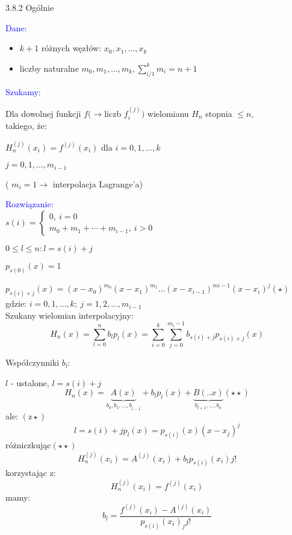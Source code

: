 \begin{frame}
{3.8.2 Ogólnie}

\textcolor{blue}{Dane:}
\begin{itemize}
\item $k+1$ różnych węzłów: $x_{0}, x_{1}, \dots, x_{k}$

\item liczby naturalne $m_{0}, m_{1},\dots , m_{k}, \displaystyle \sum_{i/1}^{k}m_{i}=n+1$
\end{itemize}
\textcolor{blue}{Szukamy:}

Dla dowolnej funkcji $ f(\rightarrow$liczb {\it $f_{i}^{(j)}$}$)$ wielomianu $H_{n}$ stopnia $\leq n,$ \\
takiego, że:

$H_{n}^{(j)}(x_{i})=f^{(j)}(x_{i})$ \quad dla $i=0, 1, \dots , k$
\begin{center}
$j=0, 1, \dots, m_{i-1}$
\end{center}
( $m_{i}=1\rightarrow$ interpolacja Lagrange'a)
\end{frame}

\begin{frame}
\textcolor{blue}{Rozwiązanie:} \\
\vspace{2mm}
$s(i)=\left\{\begin{array}{l}
0,\ i=0\\
m_{0}+m_{1}+\cdots+m_{i-1},\ i>0
\end{array}\right.$
\vspace{2mm}

$0\leq l\leq n:l=s(i)+j$

$p_{s(0)}(x)=1$

$p_{s(i)+j}(x)=(x-x_{0})^{m_{0}}(x-x_{1})^{m_{1}}\ldots(x-x_{i-1})^{mi-1}(x-x_{i})^{j}(\star)$ \\
gdzie: $i=0, 1, \dots, k; \: j=1, 2, \dots , m_{i-1}$ \\
\vspace{3mm}
Szukany wielomian interpolacyjny:
$$
H_{n}(x)=\sum_{l=0}^{n}b_{l}p_{l}(x)=\sum_{i=0}^{k}\sum_{j=0}^{m_i-1}b_{s(i)+j}p_{s(i)+j}(x)
$$
\end{frame}

\begin{frame}
Współczynniki $b_{l}$:


$l$ - ustalone, $l=s(i)+j$
$$
H_{n}(x)=\underbrace{A(x)}_{b_{0},{b_{1},\ldots,b}_{l-1}}+b_{l}p_{l}(x)+\underbrace{B(..x)}_{b_{l+1},\ldots,b_{n}}(\star\star)
$$
ale: $(\mathrm{z}\star)$
$$
l=s(i)+jp_{l}(x)=p_{s(i)}(x)(x-x_{j})^{j}
$$
$
$różniczkując$(\star\star)
$
$$
H_{n}^{(j)}(x_{i})=A^{(j)}(x_{i})+b_{l}p_{s(i)}(x_{i})j!
$$
korzystając $\mathrm{z}$:
$$
H_{n}^{(j)}(x_{i})=f^{(j)}(x_{i})
$$
mamy:
$$
b_{l}=\frac{f^{(j)}(x_{i})-A^{(j)}(x_{i})}{p_{s(i)}(x_{i})_{j}j!}
$$

\end{frame}
